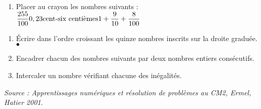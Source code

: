\begin{activite}
\begin{QCM}
\begin{enumerate}
            \item Placer au crayon les nombres suivants : $\hfill \dfrac{255}{100} \hfill 0,23 \hfill \text{cent-six centièmes} \hfill 1+\dfrac{9}{10}+\dfrac{8}{100} \hfill$
         \end{enumerate}
         \begin{enumerate}
            \item Écrire dans l'ordre croissant les quinze nombres inscrits sur la droite graduée. \\ [2mm]
               $\bullet$ \pfh \medskip
            \item Encadrer chacun des nombres suivants par deux nombres entiers consécutifs. \medskip
            \item Intercaler un nombre vérifiant chacune des inégalités. \medskip
         \end{enumerate}
      \vspace*{-3mm}
   \end{QCM}
   \vfill\hfill{\it\footnotesize Source : Apprentissages numériques et résolution de problèmes au CM2, Ermel, Hatier 2001}.
\end{activite}


